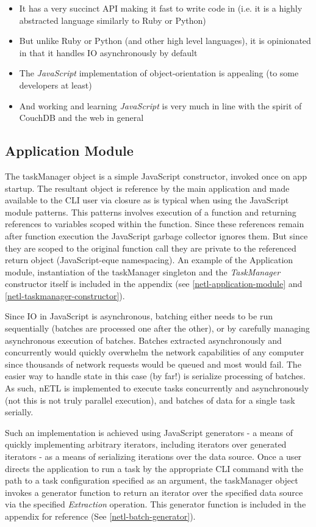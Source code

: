 \begin{itemize}
    \item It has a very succinct API making it fast to write code in (i.e. it is a highly abstracted language similarly to Ruby or Python)
    \item But unlike Ruby or Python (and other high level languages), it is opinionated in that it handles IO asynchronously by default
    \item The \textit{JavaScript} implementation of object-orientation is appealing (to some developers at least)
    \item And working and learning \textit{JavaScript} is very much in line with the spirit of CouchDB and the web in general
\end{itemize}

\subsection{Application Module}
The taskManager object is a simple JavaScript constructor, invoked once on app startup. The resultant object is reference by the main application and made available to the CLI user via closure as is typical when using the JavaScript module patterns. This patterns involves execution of a function and returning references to variables scoped within the function. Since these references remain after function execution the JavaScript garbage collector ignores them. But since they are scoped to the original function call they are private to the referenced return object (JavaScript-eque namespacing). An example of the Application module, instantiation of the taskManager singleton and the \textit{TaskManager} constructor itself is included in the appendix (see \ref{netl-application-module} and \ref{netl-taskmanager-constructor}).

Since IO in JavaScript is asynchronous, batching either needs to be run sequentially (batches are processed one after the other), or by carefully managing asynchronous execution of batches. Batches extracted asynchronously and concurrently would quickly overwhelm the network capabilities of any computer since thousands of network requests would be queued and most would fail. The easier way to handle state in this case (by far!) is serialize processing of batches. As such, nETL is implemented to execute tasks concurrently and asynchronously (not this is not truly parallel execution), and batches of data for a single task serially.

Such an implementation is achieved using JavaScript generators - a means of quickly implementing arbitrary iterators, including iterators over generated iterators \cite{mozillaGenerators} - as a means of serializing iterations over the data source. Once a user directs the application to run a task by the appropriate CLI command with the path to a task configuration specified as an argument, the taskManager object invokes a generator function to return an iterator over the specified data source via the specified \textit{Extraction} operation. This generator function is included in the appendix for reference (See \ref{netl-batch-generator}).

